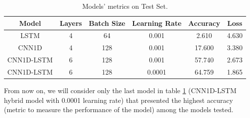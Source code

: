 \begin{table}[h]
	\centering
	\small
	\begin{tabular}{|c|c|c|c|c|c|}
		\hline
		Model        & Layers & Batch Size & Learning Rate & Accuracy & Loss \\ \hline
		LSTM         & 4      &  64        & 0.001         &  2.610   & 4.630           \\
		CNN1D        & 4      & 128        & 0.001         & 17.600   & 3.380           \\
		CNN1D-LSTM  & 6      & 128        & 0.001         & 57.740   & 2.673           \\ 		
		CNN1D-LSTM  & 6      & 128        & 0.0001		   & 64.759   & 1.865           \\ \hline		
	\end{tabular}
\caption{Models' metrics on Test Set.}
\label{Table:DLModels}
\end{table}

From now on, we will consider only the last model in table \ref{Table:DLModels} (CNN1D-LSTM hybrid model with 0.0001 learning rate) that presented the highest accuracy (metric to measure the performance of the model) among the models tested. 

